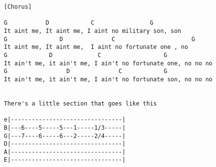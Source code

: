 \documentclass{article}%
\begin{document}
\begin{verbatim}
[Chorus]

G           D            C                G
It aint me, It aint me, I aint no military son, son
G               D              C                      G
It aint me, It aint me,  I aint no fortunate one , no
G            D             C                  G
It ain't me, it ain't me, I ain't no fortunate one, no no no
G                 D              C            G
It ain't me, it ain't me, I ain't no fortunate son, no no no


There's a little section that goes like this

e|--------------------------------|
B|---6----5-----5---1-----1/3-----|
G|---7----6-----6---2-----2/4-----|
D|--------------------------------|
A|--------------------------------|
E|--------------------------------|
\end{verbatim}
\end{document}
